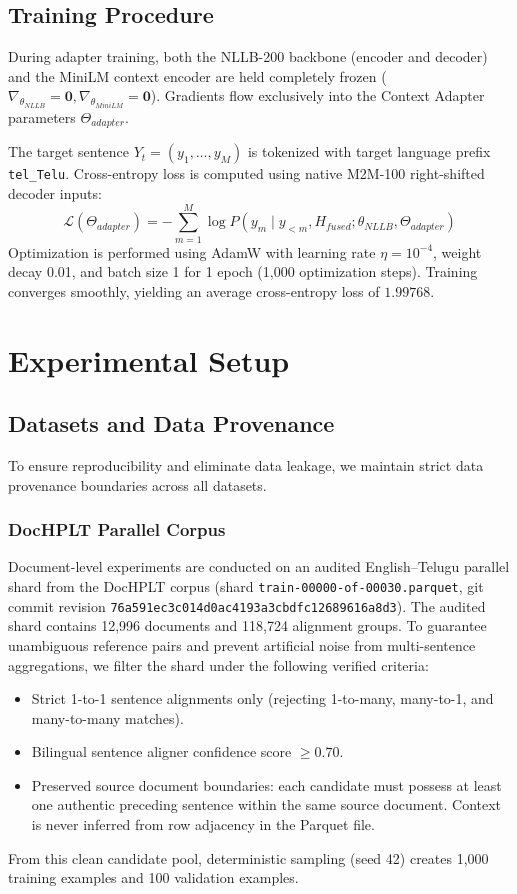 \documentclass[conference]{IEEEtran}
\begin{document}
\subsection{Training Procedure}
During adapter training, both the NLLB-200 backbone (encoder and decoder) and the MiniLM context encoder are held completely frozen ($\nabla_{\theta_{NLLB}} = \mathbf{0}, \nabla_{\theta_{MiniLM}} = \mathbf{0}$). Gradients flow exclusively into the Context Adapter parameters $\Theta_{adapter}$.

The target sentence $Y_t = (y_1, \dots, y_M)$ is tokenized with target language prefix \texttt{tel\_Telu}. Cross-entropy loss is computed using native M2M-100 right-shifted decoder inputs:
\begin{equation}
\mathcal{L}(\Theta_{adapter}) = -\sum_{m=1}^M \log P(y_m \mid y_{<m}, H_{fused}; \theta_{NLLB}, \Theta_{adapter})
\end{equation}
Optimization is performed using AdamW with learning rate $\eta = 10^{-4}$, weight decay 0.01, and batch size 1 for 1 epoch (1,000 optimization steps). Training converges smoothly, yielding an average cross-entropy loss of $1.99768$.

\section{Experimental Setup}
\label{sec:experiments}

\subsection{Datasets and Data Provenance}
To ensure reproducibility and eliminate data leakage, we maintain strict data provenance boundaries across all datasets.

\subsubsection{DocHPLT Parallel Corpus}
Document-level experiments are conducted on an audited English--Telugu parallel shard from the DocHPLT corpus \cite{obrien2025dochplt} (shard \texttt{train-00000-of-00030.parquet}, git commit revision \texttt{76a591ec3c014d0ac4193a3cbdfc12689616a8d3}). The audited shard contains 12,996 documents and 118,724 alignment groups. To guarantee unambiguous reference pairs and prevent artificial noise from multi-sentence aggregations, we filter the shard under the following verified criteria:
\begin{itemize}
    \item Strict 1-to-1 sentence alignments only (rejecting 1-to-many, many-to-1, and many-to-many matches).
    \item Bilingual sentence aligner confidence score $\ge 0.70$.
    \item Preserved source document boundaries: each candidate must possess at least one authentic preceding sentence within the same source document. Context is never inferred from row adjacency in the Parquet file.
\end{itemize}
From this clean candidate pool, deterministic sampling (seed 42) creates 1,000 training examples and 100 validation examples.
\end{document}

